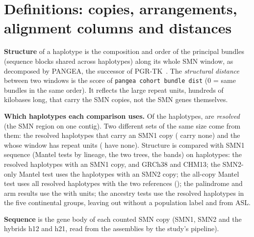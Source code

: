 \section{Definitions: copies, arrangements, alignment columns and distances}\label{sec:compared}
\textbf{Structure} of a haplotype is the composition and order of the principal bundles (sequence blocks shared
across haplotypes) along its whole SMN window, as decomposed by PANGEA, the successor of PGR-TK~\cite{chin2023}.
The \emph{structural distance} between two windows is the score of \texttt{pangea cohort bundle dist} (0 =
same bundles in the same order). It reflects the large repeat units, hundreds of kilobases long, that carry the SMN copies, not the SMN genes themselves.

\textbf{Which haplotypes each comparison uses.} Of the \nHapsAll{} haplotypes, \nHapsRes{} are \emph{resolved} (the SMN region on one contig). Two different sets of the same size come from them: the \nHapsResSMNone{} resolved haplotypes that carry an SMN1 copy (\nHapsResNoSMNone{} carry none) and the \palHaps{} whose window has repeat units (\nHapsNoUnits{} have none). Structure is compared with SMN1 sequence (Mantel tests by lineage, the two trees, the bands) on \mlbHaps{} haplotypes: the \nHapsResSMNone{} resolved haplotypes with an SMN1 copy, and GRCh38 and CHM13; the SMN2-only Mantel test uses the \mTwoN{} haplotypes with an SMN2 copy; the all-copy Mantel test uses all \nHapsRes{} resolved haplotypes with the two references (\setAllCopy); the palindrome and arm results use the \palHaps{} with units; the ancestry tests use the \anHaps{} resolved haplotypes in the five continental groups, leaving out \setNoLab{} without a population label and \setAsl{} from ASL.

\textbf{Sequence} is the gene body of each counted SMN copy (SMN1, SMN2 and the hybrids h12 and h21, read from the
assemblies by the study's pipeline).

